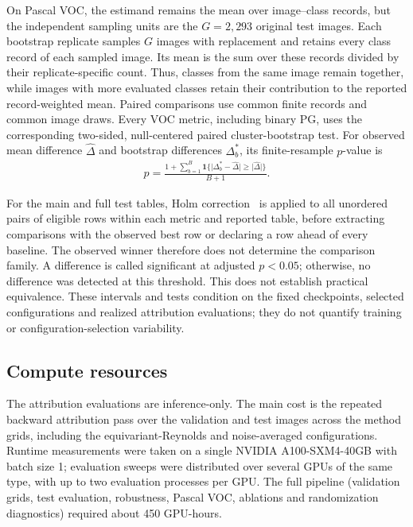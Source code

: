 \documentclass[twoside]{article}
\newcommand{\1}{\mathbf{1}}
\begin{document}
On Pascal VOC, the estimand remains the mean over image--class records, but the independent
sampling units are the $G=2{,}293$ original test images. Each bootstrap replicate samples $G$
images with replacement and retains every class record of each sampled image. Its mean is the sum
over these records divided by their replicate-specific count. Thus, classes from the same image
remain together, while images with more evaluated classes retain their contribution to the
reported record-weighted mean. Paired comparisons use common finite records and common image
draws. Every VOC metric, including binary PG, uses the corresponding two-sided, null-centered
paired cluster-bootstrap test. For observed mean difference $\widehat\Delta$ and bootstrap
differences $\Delta_b^*$, its finite-resample $p$-value is
\begin{align}
    p=\frac{1+\sum_{b=1}^{B}\1\{\lvert\Delta_b^*-\widehat\Delta\rvert
        \geq\lvert\widehat\Delta\rvert\}}{B+1}.
\end{align}

For the main and full test tables, Holm correction~\citep{Holm1979} is applied to all unordered
pairs of eligible rows within each metric and reported table, before extracting comparisons with
the observed best row or declaring a row ahead of every baseline. The observed winner therefore
does not determine the comparison family. A difference is called significant at adjusted
$p<0.05$; otherwise, no difference was detected at this threshold. This does not establish
practical equivalence. These intervals and tests condition on the fixed checkpoints, selected
configurations and realized attribution evaluations; they do not quantify training or
configuration-selection variability.

\subsection{Compute resources}\label{app:compute-resources}

The attribution evaluations are inference-only. The main cost is the repeated backward attribution
pass over the validation and test images across the method grids, including the
equivariant-Reynolds and noise-averaged configurations. Runtime measurements were taken on a single
NVIDIA A100-SXM4-40GB with batch size 1; evaluation sweeps were distributed over several GPUs of
the same type, with up to two evaluation processes per GPU. The full pipeline (validation grids,
test evaluation, robustness, Pascal VOC, ablations and randomization diagnostics) required about
450 GPU-hours.
\end{document}
